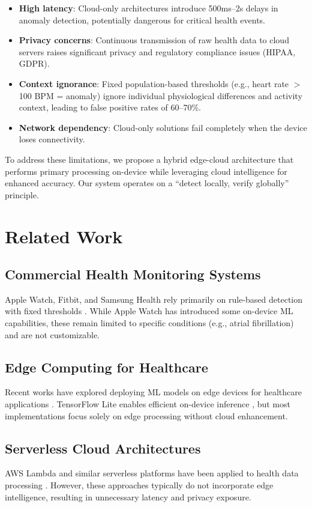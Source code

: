 \documentclass[conference]{IEEEtran}
\begin{document}
\begin{itemize}
    \item \textbf{High latency}: Cloud-only architectures introduce 500ms--2s delays in anomaly detection, potentially dangerous for critical health events.
    \item \textbf{Privacy concerns}: Continuous transmission of raw health data to cloud servers raises significant privacy and regulatory compliance issues (HIPAA, GDPR).
    \item \textbf{Context ignorance}: Fixed population-based thresholds (e.g., heart rate $>$ 100 BPM = anomaly) ignore individual physiological differences and activity context, leading to false positive rates of 60--70\%.
    \item \textbf{Network dependency}: Cloud-only solutions fail completely when the device loses connectivity.
\end{itemize}

To address these limitations, we propose a hybrid edge-cloud architecture that performs primary processing on-device while leveraging cloud intelligence for enhanced accuracy. Our system operates on a ``detect locally, verify globally'' principle.

\section{Related Work}
\subsection{Commercial Health Monitoring Systems}
Apple Watch, Fitbit, and Samsung Health rely primarily on rule-based detection with fixed thresholds \cite{apple_watch, fitbit}. While Apple Watch has introduced some on-device ML capabilities, these remain limited to specific conditions (e.g., atrial fibrillation) and are not customizable.

\subsection{Edge Computing for Healthcare}
Recent works have explored deploying ML models on edge devices for healthcare applications \cite{edge_health1, edge_health2}. TensorFlow Lite enables efficient on-device inference \cite{tflite}, but most implementations focus solely on edge processing without cloud enhancement.

\subsection{Serverless Cloud Architectures}
AWS Lambda and similar serverless platforms have been applied to health data processing \cite{serverless_health}. However, these approaches typically do not incorporate edge intelligence, resulting in unnecessary latency and privacy exposure.
\end{document}
